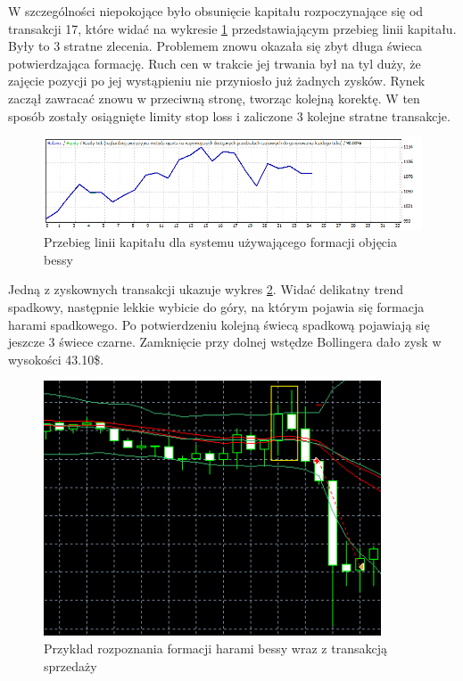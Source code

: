 \documentclass[pdflatex,11pt]{aghdpl}
\begin{document}
W szczególności niepokojące było obsunięcie kapitału rozpoczynające się od transakcji 17, które widać na wykresie \ref{linia_kap_harami} przedstawiającym przebieg linii kapitału. Były to 3 stratne zlecenia. Problemem znowu okazała się zbyt długa świeca potwierdzająca formację. Ruch cen w trakcie jej trwania był na tyl duży, że zajęcie pozycji po jej wystąpieniu nie przyniosło już żadnych zysków. Rynek zaczął zawracać znowu w przeciwną stronę, tworząc kolejną korektę. W ten sposób zostały osiągnięte limity stop loss i zaliczone 3 kolejne stratne transakcje.
\begin{figure}[h!]
\begin{center}
\includegraphics[width=16cm]{bearishharami/linia_kap.png}
\caption{Przebieg linii kapitału dla systemu używającego formacji objęcia bessy}
\label{linia_kap_harami}
\end{center}
\end{figure} 

Jedną z zyskownych transakcji ukazuje wykres \ref{przyklad_harami_bessy}. Widać delikatny trend spadkowy, następnie lekkie wybicie do góry, na którym pojawia się formacja harami spadkowego. Po potwierdzeniu kolejną świecą spadkową pojawiają się jeszcze 3 świece czarne. Zamknięcie przy dolnej wstędze Bollingera dało zysk w wysokości 43.10\$. 
\begin{figure}[h!]
\begin{center}
\includegraphics[width=10cm]{bearishharami/przyklad.png}
\caption{Przykład rozpoznania formacji harami bessy wraz z transakcją sprzedaży}
\label{przyklad_harami_bessy}
\end{center}
\end{figure} 
\end{document}
